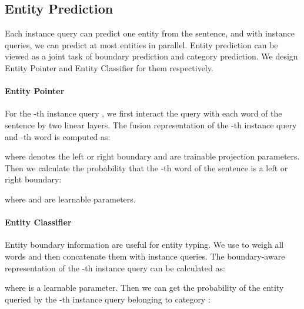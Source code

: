 \documentclass[11pt]{article}
\begin{document}
\subsection{Entity Prediction}
\label{prediction}

Each instance query can predict one entity from the sentence, and with  instance queries, we can predict at most  entities in parallel. Entity prediction can be viewed as a joint task of boundary prediction and category prediction. We design Entity Pointer and Entity Classifier for them respectively.

\paragraph{Entity Pointer} For the -th instance query , we first interact the query with each word of the sentence by two linear layers. The fusion representation of the -th instance query and -th word is computed as:



\noindent where  denotes the left or right boundary and  are trainable projection parameters. Then we calculate the probability that the -th word of the sentence is a left or right boundary:




\noindent where  and  are learnable parameters.





















\paragraph{Entity Classifier} Entity boundary information are useful for entity typing.
We use {} to weigh all words and then concatenate them with instance queries. The boundary-aware representation of the -th instance query can be calculated as:








\noindent where  is a learnable parameter. 
Then we can get the probability of the entity queried by the -th instance query belonging to category :
\end{document}
